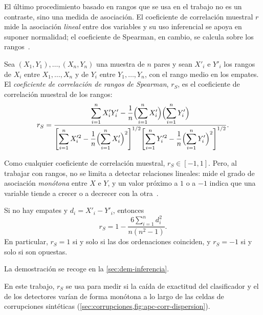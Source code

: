 El último procedimiento basado en rangos que se usa en el trabajo no es un contraste, sino una medida de asociación. El coeficiente de correlación muestral $r$ mide la asociación \emph{lineal} entre dos variables y su uso inferencial se apoya en suponer normalidad; el coeficiente de Spearman, en cambio, se calcula sobre los rangos~\cite[sec.~15.6]{canavos2003}.

\begin{definicion}\label{def:spearman}
Sea $(X_1, Y_1), \dots, (X_n, Y_n)$ una muestra de $n$ pares y sean $X'_i$ e $Y'_i$ los rangos de $X_i$ entre $X_1, \dots, X_n$ y de $Y_i$ entre $Y_1, \dots, Y_n$, con el rango medio en los empates. El \emph{coeficiente de correlación de rangos de Spearman}, $r_S$, es el coeficiente de correlación muestral de los rangos:
\[
  r_S = \frac{\displaystyle\sum_{i=1}^{n} X'_i Y'_i - \frac{1}{n}\Bigl(\sum_{i=1}^{n} X'_i\Bigr)\Bigl(\sum_{i=1}^{n} Y'_i\Bigr)}
  {\displaystyle\Biggl[\sum_{i=1}^{n} X'^2_i - \frac{1}{n}\Bigl(\sum_{i=1}^{n} X'_i\Bigr)^2\Biggr]^{1/2}
   \Biggl[\sum_{i=1}^{n} Y'^2_i - \frac{1}{n}\Bigl(\sum_{i=1}^{n} Y'_i\Bigr)^2\Biggr]^{1/2}} .
\]
\end{definicion}

Como cualquier coeficiente de correlación muestral, $r_S \in [-1, 1]$. Pero, al trabajar con rangos, no se limita a detectar relaciones lineales: mide el grado de asociación \emph{monótona} entre $X$ e $Y$, y un valor próximo a $1$ o a $-1$ indica que una variable tiende a crecer o a decrecer con la otra~\cite[sec.~15.6]{canavos2003}.

\begin{proposicion}\label{prop:spearman-sin-empates}
Si no hay empates y $d_i = X'_i - Y'_i$, entonces
\[
  r_S = 1 - \frac{6 \sum_{i=1}^{n} d_i^2}{n(n^2 - 1)} .
\]
En particular, $r_S = 1$ si y solo si las dos ordenaciones coinciden, y $r_S = -1$ si y solo si son opuestas.
\end{proposicion}
La demostración se recoge en la \cref{sec:dem-inferencia}.

En este trabajo, $r_S$ se usa para medir si la caída de exactitud del clasificador y el \AUROC de los detectores varían de forma monótona a lo largo de las celdas de corrupciones sintéticas (\cref{sec:corrupciones,fig:apc-corr-dispersion}).

